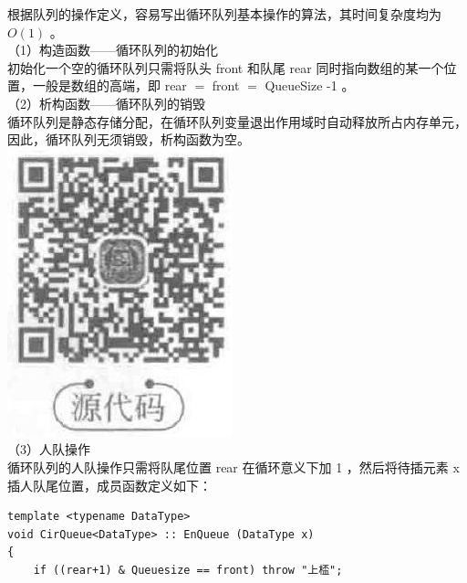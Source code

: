 \documentclass[10pt]{article}
\begin{document}
根据队列的操作定义，容易写出循环队列基本操作的算法，其时间复杂度均为 $O(1)$ 。\\
（1）构造函数——循环队列的初始化\\
初始化一个空的循环队列只需将队头 front 和队尾 rear 同时指向数组的某一个位置，一般是数组的高端，即 rear $=$ front $=$ QueueSize -1 。\\
（2）析构函数——循环队列的销毁\\
循环队列是静态存储分配，在循环队列变量退出作用域时自动释放所占内存单元，因此，循环队列无须销毁，析构函数为空。\\
\includegraphics[max width=\textwidth, center]{2025_06_06_704745ea57b15b2333e5g-094(2)}\\
（3）人队操作\\
循环队列的人队操作只需将队尾位置 rear 在循环意义下加 1 ，然后将待插元素 x 插人队尾位置，成员函数定义如下：

\begin{verbatim}
template <typename DataType>
void CirQueue<DataType> :: EnQueue (DataType x)
{
    if ((rear+1) & Queuesize == front) throw "上㮎";
\end{verbatim}
\end{document}
